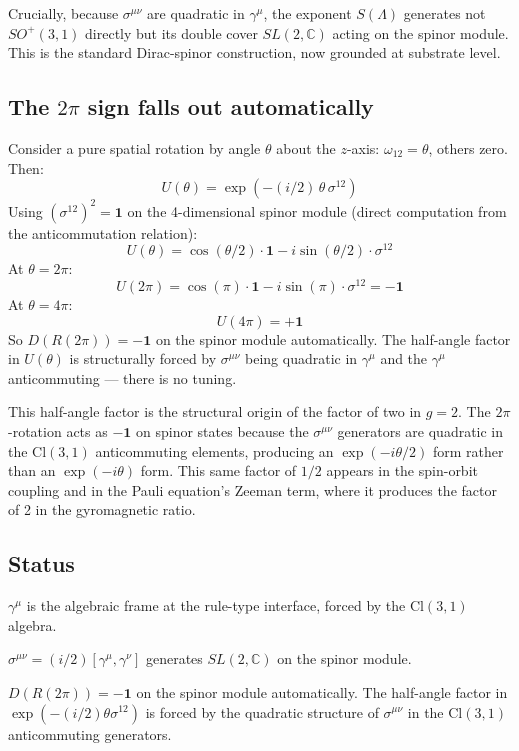 \documentclass[11pt,a4paper]{article}
\begin{document}
Crucially, because $\sigma^{\mu\nu}$ are quadratic in $\gamma^\mu$, the exponent $S(\Lambda)$ generates not $SO^+(3,1)$ directly but its double cover $SL(2, \mathbb{C})$ acting on the spinor module. This is the standard Dirac-spinor construction, now grounded at substrate level.

\subsection{The $2\pi$ sign falls out automatically}

Consider a pure spatial rotation by angle $\theta$ about the $z$-axis: $\omega_{12} = \theta$, others zero. Then:
\[
U(\theta) = \exp\!\left(-(i/2)\, \theta\, \sigma^{12}\right)
\]
Using $(\sigma^{12})^2 = \mathbf{1}$ on the 4-dimensional spinor module (direct computation from the anticommutation relation):
\[
U(\theta) = \cos(\theta/2)\cdot\mathbf{1} - i\sin(\theta/2)\cdot\sigma^{12}
\]
At $\theta = 2\pi$:
\[
U(2\pi) = \cos(\pi)\cdot\mathbf{1} - i\sin(\pi)\cdot\sigma^{12} = -\mathbf{1}
\]
At $\theta = 4\pi$:
\[
U(4\pi) = +\mathbf{1}
\]
So $D(R(2\pi)) = -\mathbf{1}$ on the spinor module automatically. The half-angle factor in $U(\theta)$ is structurally forced by $\sigma^{\mu\nu}$ being quadratic in $\gamma^\mu$ and the $\gamma^\mu$ anticommuting --- there is no tuning.

This half-angle factor is the structural origin of the factor of two in $g = 2$. The $2\pi$-rotation acts as $-\mathbf{1}$ on spinor states because the $\sigma^{\mu\nu}$ generators are quadratic in the $\mathrm{Cl}(3,1)$ anticommuting elements, producing an $\exp(-i\theta/2)$ form rather than an $\exp(-i\theta)$ form. This same factor of $1/2$ appears in the spin-orbit coupling and in the Pauli equation's Zeeman term, where it produces the factor of 2 in the gyromagnetic ratio.

\subsection{Status}

$\gamma^\mu$ is the algebraic frame at the rule-type interface, forced by the $\mathrm{Cl}(3,1)$ algebra.

$\sigma^{\mu\nu} = (i/2)[\gamma^\mu, \gamma^\nu]$ generates $SL(2, \mathbb{C})$ on the spinor module.

$D(R(2\pi)) = -\mathbf{1}$ on the spinor module automatically. The half-angle factor in $\exp(-(i/2)\theta\sigma^{12})$ is forced by the quadratic structure of $\sigma^{\mu\nu}$ in the $\mathrm{Cl}(3,1)$ anticommuting generators.
\end{document}
